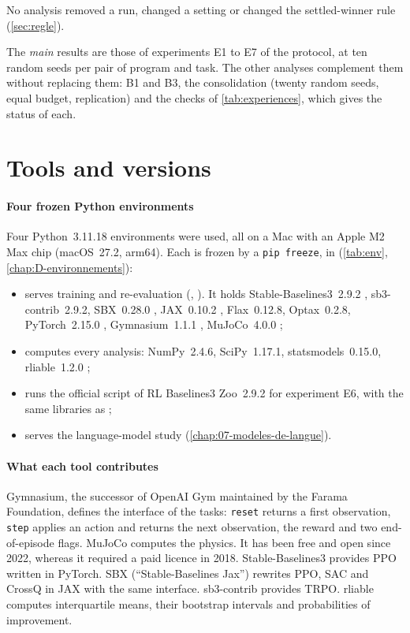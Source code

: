 No analysis removed a run, changed a setting or changed the settled-winner rule (\cref{sec:regle}).

The \emph{main} results are those of experiments E1 to E7 of the protocol, at ten random seeds per pair of
program and task. The other analyses complement them without replacing them: B1 and B3, the consolidation
(twenty random seeds, equal budget, replication) and the checks of \cref{tab:experiences}, which gives the
status of each.

\section{Tools and versions}\label{sec:outils}

\paragraph{Four frozen Python environments}
Four Python~3.11.18 environments were used, all on a Mac with an Apple M2 Max chip (macOS~27.2, arm64). Each
is frozen by a \texttt{pip freeze}, in  (\cref{tab:env},
\cref{chap:D-environnements}):
\begin{itemize}
  \item {} serves training and re-evaluation (, ). It holds
    Stable-Baselines3~2.9.2 \parencite{raffin2021sb3}, sb3-contrib~2.9.2, SBX~0.28.0 \parencite{raffin2023sbx}, JAX~0.10.2
    \parencite{bradbury2018jax}, Flax~0.12.8, Optax~0.2.8, PyTorch~2.15.0 \parencite{paszke2019pytorch},
    Gymnasium~1.1.1 \parencite{towers2024gymnasium}, MuJoCo~4.0.0 \parencite{todorov2012mujoco};
  \item {} computes every analysis: NumPy~2.4.6, SciPy~1.17.1, statsmodels~0.15.0,
    rliable~1.2.0 \parencite{agarwal2021precipice};
  \item {} runs the official script of RL Baselines3 Zoo~2.9.2 \parencite{raffin2020zoo}
    for experiment E6, with the same libraries as ;
  \item {} serves the language-model study (\cref{chap:07-modeles-de-langue}).
\end{itemize}

\paragraph{What each tool contributes}
Gymnasium, the successor of OpenAI Gym maintained by the Farama Foundation, defines the interface of the
tasks: \texttt{reset} returns a first observation, \texttt{step} applies an action and returns the next
observation, the reward and two end-of-episode flags. MuJoCo computes the physics. It has been free and open
since 2022, whereas it required a paid licence in 2018. Stable-Baselines3 provides PPO written in PyTorch.
SBX (\enquote{Stable-Baselines Jax}) rewrites PPO, SAC and CrossQ in JAX with the same interface. sb3-contrib
provides TRPO. rliable computes interquartile means, their bootstrap intervals and probabilities of
improvement.

